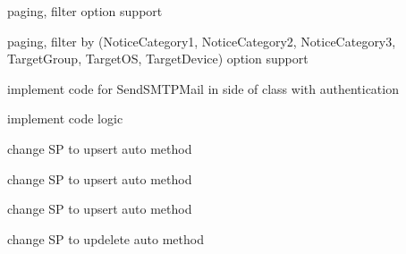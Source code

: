 \begin{DoxyRefList}
\item[\label{a00001__todo000011}%
\hypertarget{a00001__todo000011}{}%
File \hyperlink{a00223}{C\+B\+Sel\+Member\+Game\+Info\+Stages\+Controller.cs} ]paging, filter option support  
\item[\label{a00001__todo000012}%
\hypertarget{a00001__todo000012}{}%
File \hyperlink{a00225}{C\+B\+Sel\+Notices\+Controller.cs} ]paging, filter by (Notice\+Category1, Notice\+Category2, Notice\+Category3, Target\+Group, Target\+OS, Target\+Device) option support  
\item[\label{a00001__todo000013}%
\hypertarget{a00001__todo000013}{}%
File \hyperlink{a00226}{C\+B\+Sel\+Send\+Email\+To\+Member\+Controller.cs} ]implement code for Send\+S\+M\+T\+P\+Mail in side of class with authentication  
\item[\label{a00001__todo000014}%
\hypertarget{a00001__todo000014}{}%
File \hyperlink{a00227}{C\+B\+Udt\+Confirmed\+Email\+Address\+Controller.cs} ]implement code logic  
\item[\label{a00001__todo000015}%
\hypertarget{a00001__todo000015}{}%
File \hyperlink{a00228}{C\+B\+Udt\+Coupon\+Member\+Controller.cs} ]change SP to upsert auto method  
\item[\label{a00001__todo000016}%
\hypertarget{a00001__todo000016}{}%
File \hyperlink{a00229}{C\+B\+Udt\+Game\+Event\+Member\+To\+Item\+Controller.cs} ]change SP to upsert auto method  
\item[\label{a00001__todo000017}%
\hypertarget{a00001__todo000017}{}%
File \hyperlink{a00231}{C\+B\+Udt\+Move\+Gift\+Controller.cs} ]change SP to upsert auto method  
\item[\label{a00001__todo000018}%
\hypertarget{a00001__todo000018}{}%
File \hyperlink{a00234}{C\+D\+Udt\+Return\+Item\+Controller.cs} ]change SP to updelete auto method 
\end{DoxyRefList}
